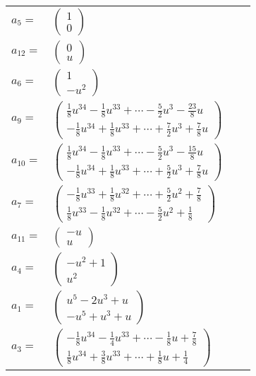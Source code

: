 \documentclass[1p]{elsarticle_modified}
\theoremstyle{definition}
\begin{document}
\begin{tabular}{m{7pt} m{180pt} m{7pt} m{180pt} }
\flushright $a_{5}=$&$\begin{pmatrix}1\\0\end{pmatrix}$ \\
\flushright $a_{12}=$&$\begin{pmatrix}0\\u\end{pmatrix}$ \\
\flushright $a_{6}=$&$\begin{pmatrix}1\\- u^2\end{pmatrix}$ \\
\flushright $a_{9}=$&$\begin{pmatrix}\frac{1}{8} u^{34}-\frac{1}{8} u^{33}+\cdots-\frac{5}{2} u^3-\frac{23}{8} u\\-\frac{1}{8} u^{34}+\frac{1}{8} u^{33}+\cdots+\frac{7}{2} u^3+\frac{7}{8} u\end{pmatrix}$ \\
\flushright $a_{10}=$&$\begin{pmatrix}\frac{1}{8} u^{34}-\frac{1}{8} u^{33}+\cdots-\frac{5}{2} u^3-\frac{15}{8} u\\-\frac{1}{8} u^{34}+\frac{1}{8} u^{33}+\cdots+\frac{5}{2} u^3+\frac{7}{8} u\end{pmatrix}$ \\
\flushright $a_{7}=$&$\begin{pmatrix}-\frac{1}{8} u^{33}+\frac{1}{8} u^{32}+\cdots+\frac{5}{2} u^2+\frac{7}{8}\\\frac{1}{8} u^{33}-\frac{1}{8} u^{32}+\cdots-\frac{5}{2} u^2+\frac{1}{8}\end{pmatrix}$ \\
\flushright $a_{11}=$&$\begin{pmatrix}- u\\u\end{pmatrix}$ \\
\flushright $a_{4}=$&$\begin{pmatrix}- u^2+1\\u^2\end{pmatrix}$ \\
\flushright $a_{1}=$&$\begin{pmatrix}u^5-2 u^3+u\\- u^5+u^3+u\end{pmatrix}$ \\
\flushright $a_{3}=$&$\begin{pmatrix}-\frac{1}{8} u^{34}-\frac{1}{4} u^{33}+\cdots-\frac{1}{8} u+\frac{7}{8}\\\frac{1}{8} u^{34}+\frac{3}{8} u^{33}+\cdots+\frac{1}{8} u+\frac{1}{4}\end{pmatrix}$ \\

\end{tabular}
\end{document}
